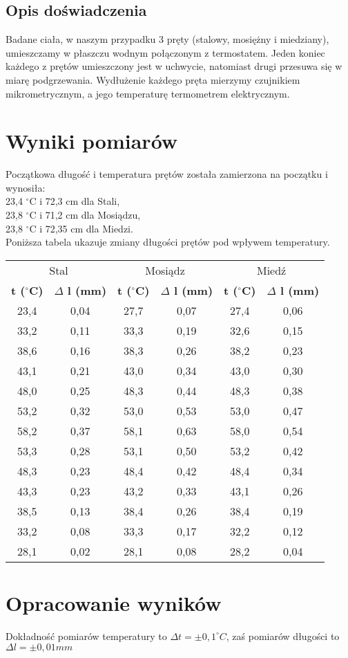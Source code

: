 \documentclass[10pt,a4paper]{article}
\newcommand{\forceindent}{\leavevmode{\parindent=3em\indent}}
\begin{document}
\subsection*{Opis doświadczenia}

\forceindent Badane ciała, w naszym przypadku 3 pręty (stalowy, mosiężny i miedziany), umieszczamy w płaszczu wodnym połączonym z termostatem. Jeden koniec każdego z prętów umieszczony jest w uchwycie, natomiast drugi przesuwa się w miarę podgrzewania. Wydłużenie każdego pręta mierzymy czujnikiem mikrometrycznym, a jego temperaturę termometrem elektrycznym.  

\section{Wyniki pomiarów}
Początkowa długość i temperatura prętów została zamierzona na początku i wynosiła:\\
23,4 $^{\circ}$C i 72,3 cm dla Stali,\\
23,8 $^{\circ}$C i 71,2 cm dla Mosiądzu,\\
23,8 $^{\circ}$C i 72,35 cm dla Miedzi.\\

\newpage
\forceindent Poniższa tabela ukazuje zmiany długości prętów pod wpływem temperatury.\\

\begin{center}
\begin{tabular}{|c|c||c|c||c|c|}
\multicolumn{2}{c}{Stal} & \multicolumn{2}{c}{Mosiądz} & \multicolumn{2}{c}{Miedź}\\
\hhline{|=|==|==|=|}
\textbf{t ($^{\circ}$C)} & \textbf{$\Delta$ l (mm)} & \textbf{t ($^{\circ}$C)} & \textbf{$\Delta$ l (mm)} & \textbf{t ($^{\circ}$C)} & \textbf{$\Delta$ l (mm)}\\
\hline
23,4 & 0,04 & 27,7 & 0,07 & 27,4 & 0,06\\
\hline
33,2 & 0,11 & 33,3 & 0,19 & 32,6 & 0,15\\
\hline
38,6 & 0,16 & 38,3 & 0,26 & 38,2 & 0,23\\
\hline
43,1 & 0,21 & 43,0 & 0,34 & 43,0 & 0,30\\
\hline
48,0 & 0,25 & 48,3 & 0,44 & 48,3 & 0,38\\
\hline
53,2 & 0,32 & 53,0 & 0,53 & 53,0 & 0,47\\
\hline
58,2 & 0,37 & 58,1 & 0,63 & 58,0 & 0,54\\
\hline
53,3 & 0,28 & 53,1 & 0,50 & 53,2 & 0,42\\
\hline
48,3 & 0,23 & 48,4 & 0,42 & 48,4 & 0,34\\
\hline
43,3 & 0,23 & 43,2 & 0,33 & 43,1 & 0,26\\
\hline
38,5 & 0,13 & 38,4 & 0,26 & 38,4 & 0,19\\
\hline
33,2 & 0,08 & 33,3 & 0,17 & 32,2 & 0,12\\
\hline
28,1 & 0,02 & 28,1 & 0,08 & 28,2 & 0,04\\
\hline

\end{tabular}
\end{center}

\section{Opracowanie wyników}
\forceindent Dokładność pomiarów temperatury to $\Delta t = \pm 0,1 ^{\circ}C$, zaś pomiarów długości to $\Delta l = \pm 0,01 mm$
\end{document}
